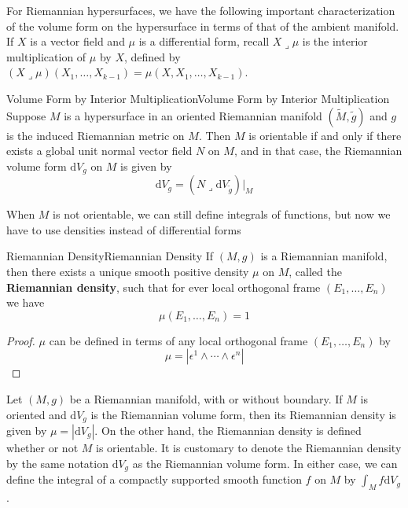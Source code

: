 \documentclass[../main.tex]{subfiles}
\begin{document}
For Riemannian hypersurfaces, we have the following important characterization of the volume form on the hypersurface in terms of that of the ambient manifold. If $X$ is a vector field and $\mu$ is a differential form, recall $X \lrcorner \mu$ is the interior multiplication of $\mu$ by $X$, defined by $(X \lrcorner \mu)(X_1, \ldots, X_{k-1}) = \mu(X, X_1, \ldots, X_{k-1})$.

\begin{proposition}{Volume Form by Interior Multiplication}{Volume Form by Interior Multiplication}
	Suppose $M$ is a hypersurface in an oriented Riemannian manifold $(\tilde{M}, \tilde{g})$ and $g$ is the induced Riemannian metric on $M$. Then $M$ is orientable if and only if there exists a global unit normal vector field $N$ on $M$, and in that case, the Riemannian volume form $\mathrm{d} V_g$ on $M$ is given by
	\begin{equation}
		\mathrm{d} V_g = (N \lrcorner \mathrm{d} V_{\tilde{g}})|_M
	\end{equation}
\end{proposition}

When $M$ is not orientable, we can still define integrals of functions, but now we have to use densities instead of differential forms
\begin{proposition}{Riemannian Density}{Riemannian Density}
	If $(M, g)$ is a Riemannian manifold, then there exists a unique smooth positive density $\mu$ on $M$, called the \textbf{Riemannian density}, such that for ever local orthogonal frame $(E_1, \ldots, E_n)$ we have
	\begin{equation}
		\mu(E_1, \ldots, E_n) = 1
	\end{equation}
\end{proposition}
\begin{proof}
	$\mu$ can be defined in terms of any local orthogonal frame $(E_1, \ldots, E_n)$ by
	\begin{equation*}
		\mu = | \epsilon^1 \wedge \cdots \wedge \epsilon^n |
	\end{equation*}
\end{proof}

Let $(M, g)$ be a Riemannian manifold, with or without boundary. If $M$ is oriented and $\mathrm{d} V_g$ is the Riemannian volume form, then its Riemannian density is given by $\mu = |\mathrm{d} V_g|$. On the other hand, the Riemannian density is defined whether or not $M$ is orientable. It is customary to denote the Riemannian density by the same notation $\mathrm{d} V_g$ as the Riemannian volume form. In either case, we can define the integral of a compactly supported smooth function $f$ on $M$ by $\int_M f \mathrm{d} V_g$.
\end{document}
